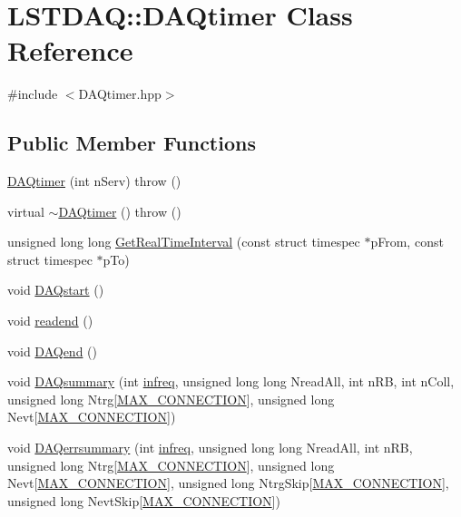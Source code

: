 \hypertarget{class_l_s_t_d_a_q_1_1_d_a_qtimer}{}\section{L\+S\+T\+D\+A\+Q\+:\+:D\+A\+Qtimer Class Reference}
\label{class_l_s_t_d_a_q_1_1_d_a_qtimer}


{\ttfamily \#include $<$D\+A\+Qtimer.\+hpp$>$}

\subsection*{Public Member Functions}
\begin{DoxyCompactItemize}
\item 
\hyperlink{class_l_s_t_d_a_q_1_1_d_a_qtimer_a6a1ab88f23496541c108388a1b268a95}{D\+A\+Qtimer} (int n\+Serv)  throw ()
\item 
virtual \hyperlink{class_l_s_t_d_a_q_1_1_d_a_qtimer_aa65cf5fdfcb8aa192f81fbd6f09862ab}{$\sim$\+D\+A\+Qtimer} ()  throw ()
\item 
unsigned long long \hyperlink{class_l_s_t_d_a_q_1_1_d_a_qtimer_a05c66a2321d3d021d61f97d06de9e5ce}{Get\+Real\+Time\+Interval} (const struct timespec $\ast$p\+From, const struct timespec $\ast$p\+To)
\item 
void \hyperlink{class_l_s_t_d_a_q_1_1_d_a_qtimer_a7cdbf21a47a53b91eca5ce168332b439}{D\+A\+Qstart} ()
\item 
void \hyperlink{class_l_s_t_d_a_q_1_1_d_a_qtimer_af9ec83544dde4d527c901e68e314d3b3}{readend} ()
\item 
void \hyperlink{class_l_s_t_d_a_q_1_1_d_a_qtimer_a8e0c31d4c5cc3b27e405f2cb9862b12b}{D\+A\+Qend} ()
\item 
void \hyperlink{class_l_s_t_d_a_q_1_1_d_a_qtimer_afbce0a37db4e92120b92332c506c366f}{D\+A\+Qsummary} (int \hyperlink{_master_8cpp_a44ff404ab6caa6e80830e799d22120a0}{infreq}, unsigned long long Nread\+All, int n\+R\+B, int n\+Coll, unsigned long Ntrg\mbox{[}\hyperlink{_config_8hpp_a1ad0110a77b8abbc3c30f7ec903dab1b}{M\+A\+X\+\_\+\+C\+O\+N\+N\+E\+C\+T\+I\+O\+N}\mbox{]}, unsigned long Nevt\mbox{[}\hyperlink{_config_8hpp_a1ad0110a77b8abbc3c30f7ec903dab1b}{M\+A\+X\+\_\+\+C\+O\+N\+N\+E\+C\+T\+I\+O\+N}\mbox{]})
\item 
void \hyperlink{class_l_s_t_d_a_q_1_1_d_a_qtimer_a192697db9ffcedb3172152207be8adc5}{D\+A\+Qerrsummary} (int \hyperlink{_master_8cpp_a44ff404ab6caa6e80830e799d22120a0}{infreq}, unsigned long long Nread\+All, int n\+R\+B, unsigned long Ntrg\mbox{[}\hyperlink{_config_8hpp_a1ad0110a77b8abbc3c30f7ec903dab1b}{M\+A\+X\+\_\+\+C\+O\+N\+N\+E\+C\+T\+I\+O\+N}\mbox{]}, unsigned long Nevt\mbox{[}\hyperlink{_config_8hpp_a1ad0110a77b8abbc3c30f7ec903dab1b}{M\+A\+X\+\_\+\+C\+O\+N\+N\+E\+C\+T\+I\+O\+N}\mbox{]}, unsigned long Ntrg\+Skip\mbox{[}\hyperlink{_config_8hpp_a1ad0110a77b8abbc3c30f7ec903dab1b}{M\+A\+X\+\_\+\+C\+O\+N\+N\+E\+C\+T\+I\+O\+N}\mbox{]}, unsigned long Nevt\+Skip\mbox{[}\hyperlink{_config_8hpp_a1ad0110a77b8abbc3c30f7ec903dab1b}{M\+A\+X\+\_\+\+C\+O\+N\+N\+E\+C\+T\+I\+O\+N}\mbox{]})

\end{DoxyCompactItemize}
